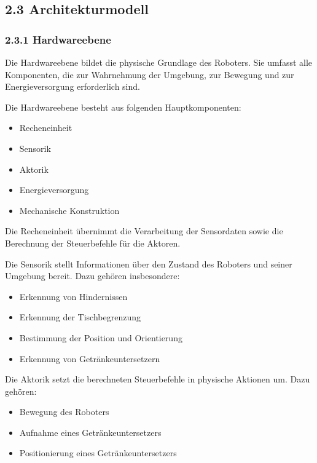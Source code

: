 \documentclass[
]{article}
\providecommand{\tightlist}{%
  \setlength{\itemsep}{0pt}\setlength{\parskip}{0pt}}
\begin{document}
\subsection{2.3 Architekturmodell}\label{architekturmodell}

\subsubsection{2.3.1 Hardwareebene}\label{hardwareebene-1}

Die Hardwareebene bildet die physische Grundlage des Roboters. Sie
umfasst alle Komponenten, die zur Wahrnehmung der Umgebung, zur Bewegung
und zur Energieversorgung erforderlich sind.

Die Hardwareebene besteht aus folgenden Hauptkomponenten:

\begin{itemize}
\tightlist
\item
  Recheneinheit
\item
  Sensorik
\item
  Aktorik
\item
  Energieversorgung
\item
  Mechanische Konstruktion
\end{itemize}

Die Recheneinheit übernimmt die Verarbeitung der Sensordaten sowie die
Berechnung der Steuerbefehle für die Aktoren.

Die Sensorik stellt Informationen über den Zustand des Roboters und
seiner Umgebung bereit. Dazu gehören insbesondere:

\begin{itemize}
\tightlist
\item
  Erkennung von Hindernissen
\item
  Erkennung der Tischbegrenzung
\item
  Bestimmung der Position und Orientierung
\item
  Erkennung von Getränkeuntersetzern
\end{itemize}

Die Aktorik setzt die berechneten Steuerbefehle in physische Aktionen
um. Dazu gehören:

\begin{itemize}
\tightlist
\item
  Bewegung des Roboters
\item
  Aufnahme eines Getränkeuntersetzers
\item
  Positionierung eines Getränkeuntersetzers
\end{itemize}
\end{document}
